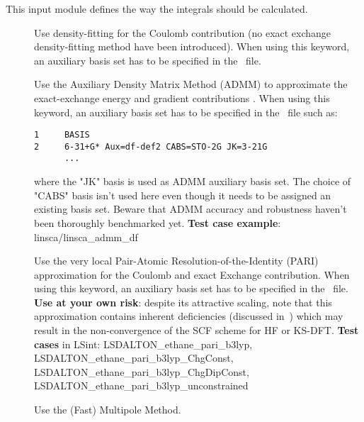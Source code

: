 This input module defines the way the integrals should be calculated.
\begin{description}

\item[] Use density-fitting for the Coulomb contribution (no exact exchange density-fitting method have been introduced). 
When using this keyword, an auxiliary basis set has to be 
specified in the \mol\ file.

\item[] Use the Auxiliary Density Matrix Method (ADMM) to approximate 
the exact-exchange energy and gradient contributions \cite{ADMM:2010}.
When using this keyword, an auxiliary basis set has to be 
specified in the \mol\ file such as:
\begin{verbatim}
1     BASIS
2     6-31+G* Aux=df-def2 CABS=STO-2G JK=3-21G
      ...
\end{verbatim} 
where the "JK" basis is used as ADMM auxiliary basis set. The choice of "CABS" basis isn't used here even though it needs to be assigned an existing basis set.
Beware that ADMM accuracy and robustness haven't been thoroughly benchmarked yet.\newline
{\bf Test case example}: linsca/linsca\_admm\_df

\item[] Use the very local Pair-Atomic Resolution-of-the-Identity (PARI) 
approximation \cite{PARI:2013} for the Coulomb and exact Exchange contribution.
When using this keyword, an auxiliary basis set has to be 
specified in the \mol\ file.\newline
{\bf Use at your own risk}: despite its attractive scaling, note that this 
approximation contains inherent deficiencies (discussed in~\cite{PARI:2013}) 
which may result in the non-convergence of the SCF scheme for HF or KS-DFT. \newline
{\bf Test cases} in LSint: LSDALTON\_ethane\_pari\_b3lyp, 
LSDALTON\_ethane\_pari\_b3lyp\_ChgConst, 
LSDALTON\_ethane\_pari\_b3lyp\_ChgDipConst, 
LSDALTON\_ethane\_pari\_b3lyp\_unconstrained


\item[] Use the (Fast) Multipole Method.


\end{description}
